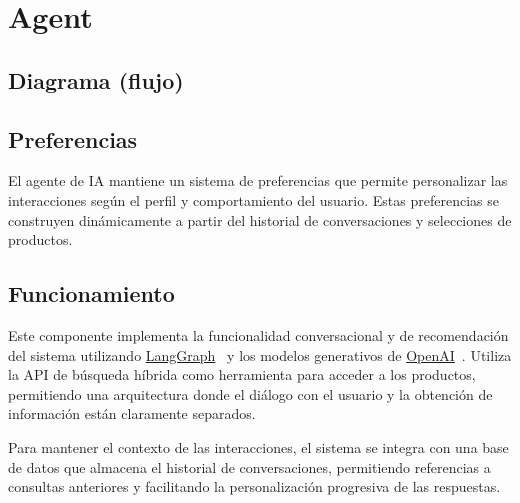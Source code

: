 \section{Agent}

\subsection{Diagrama (flujo)}


\subsection{Preferencias}

El agente de IA mantiene un sistema de preferencias que permite personalizar las interacciones según el perfil y comportamiento del usuario. Estas preferencias se construyen dinámicamente a partir del historial de conversaciones y selecciones de productos.

\subsection{Funcionamiento}

Este componente implementa la funcionalidad conversacional y de recomendación del sistema utilizando \href{https://www.langchain.com/langgraph}{LangGraph}~\cite{LangGraph} y los modelos generativos de \href{https://openai.com/}{OpenAI}~\cite{OpenAI}. Utiliza la API de búsqueda híbrida como herramienta para acceder a los productos, permitiendo una arquitectura donde el diálogo con el usuario y la obtención de información están claramente separados.

Para mantener el contexto de las interacciones, el sistema se integra con una base de datos que almacena el historial de conversaciones, permitiendo referencias a consultas anteriores y facilitando la personalización progresiva de las respuestas.
